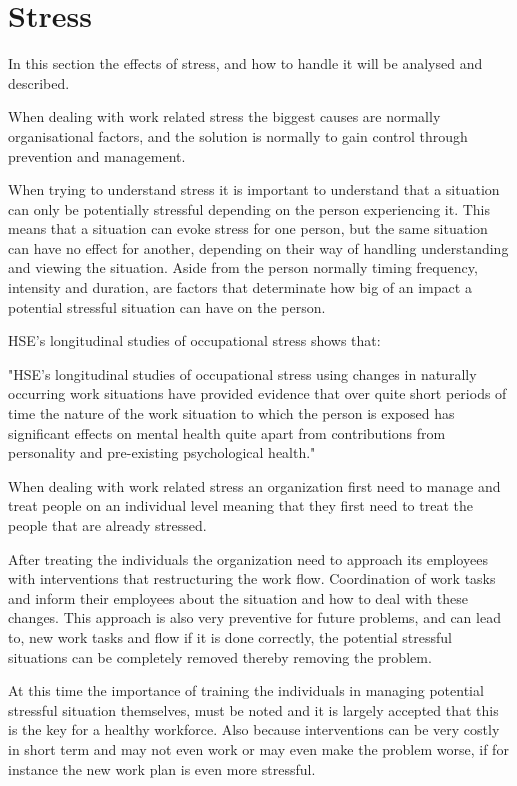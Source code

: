 \section{Stress}
In this section the effects of stress, and how to handle it will be analysed and described.

When dealing with work related stress the biggest causes are normally organisational factors, and the solution is normally to gain control through prevention and management.

When trying to understand stress it is important to understand that a situation can only be potentially stressful depending on the person experiencing it. This means that a situation can evoke stress for one person, but the same situation can have no effect for another, depending on their way of handling understanding and viewing the situation. Aside from the person normally timing frequency, intensity and duration, are factors that determinate how big of an impact a potential stressful situation can have on the person.

HSE's longitudinal studies of occupational stress shows that:

"HSE's longitudinal studies of occupational stress using changes in naturally occurring work situations have provided evidence that over quite short periods of time the nature of the work situation to which the person is exposed has significant effects on mental health quite apart from contributions from personality and pre-existing psychological health."

When dealing with work related stress an organization first need to manage and treat people on an individual level meaning that they first need to treat the people that are already stressed\cite{control_stress_work}.

After treating the individuals the organization need to approach its employees with interventions that restructuring the work flow. Coordination of work tasks and inform their employees about the situation and how to deal with these changes. This approach is also very preventive for future problems, and can lead to, new work tasks and flow if it is done correctly, the potential stressful situations can be completely removed thereby removing the problem.

At this time the importance of training the individuals in managing potential stressful situation themselves, must be noted and it is largely accepted that this is the key for a healthy workforce. Also because interventions can be very costly in short term and may not even work or may even make the problem worse, if for instance the new work plan is even more stressful.


